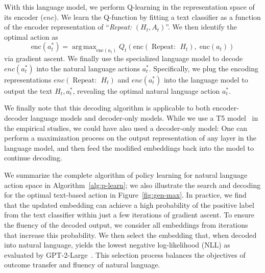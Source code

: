 \documentclass{article}
\DeclareMathOperator*{\argmax}{arg\,max}
\begin{document}
With this language model, we perform Q-learning in the representation space of its encoder ($enc$). We learn the Q-function by fitting a text classifier as a function of the encoder representation of ``\textit{Repeat:} $(H_t, A_t)$''. We then identify the optimal action as \[\text{enc}(a_t^*) = \argmax_{\text{enc}(a_t)} Q_t \left(\text{enc}\left( \operatorname{Repeat:~} H_t \right),\; \text{enc}(a_t) \right)
\] via gradient ascent. We finally use the specialized language model to decode $enc(a_t^*)$ into the natural language actions $a_t^*$. Specifically, we plug the encoding representations $enc\left( \operatorname{Repeat:~} H_t \right)$ and $enc(a_t^*)$ into the language model to output the text $H_t, a_t^*$, revealing the optimal natural language action $a_t^*$.


We finally note that this decoding algorithm is applicable to both encoder-decoder language models and decoder-only models. While we use a T5 model~\cite{raffel2020exploring} in the empirical studies, we could have also used a decoder-only model: One can perform a maximization process on the output representation of any layer in the language model, and then feed the modified embeddings back into the model to continue decoding.

We summarize the complete algorithm of policy learning for natural language action space in Algorithm~\ref{alg:p-learn}; we also illustrate the search and decoding for the optimal text-based action in Figure~\ref{fig:gen-max}. In practice, we find that the updated embedding can achieve a high probability of the positive label from the text classifier within just a few iterations of gradient ascent. To ensure the fluency of the decoded output, we consider all embeddings from iterations that increase this probability. We then select the embedding that, when decoded into natural language, yields the lowest negative log-likelihood (NLL) as evaluated by GPT-2-Large~\cite{radford2019language}. This selection process balances the objectives of outcome transfer and fluency of natural language.
\end{document}
